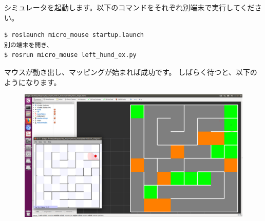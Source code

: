 \documentclass[11pt,a4paper]{jsarticle}
\begin{document}
シミュレータを起動します。以下のコマンドをそれぞれ別端末で実行してください。
\begin{lstlisting}[frame=single, caption=roscd, label=roscd]
$ roslaunch micro_mouse startup.launch
別の端末を開き、
$ rosrun micro_mouse left_hund_ex.py
\end{lstlisting}


マウスが動き出し、マッピングが始まれば成功です。
しばらく待つと、以下のようになります。
\begin{figure}[h]
  \begin{center}
    \includegraphics[width=128mm]{./mms_test.png}
  \end{center}
\end{figure}



\begin{thebibliography}{99}
\end{thebibliography}%
%
\end{document}
